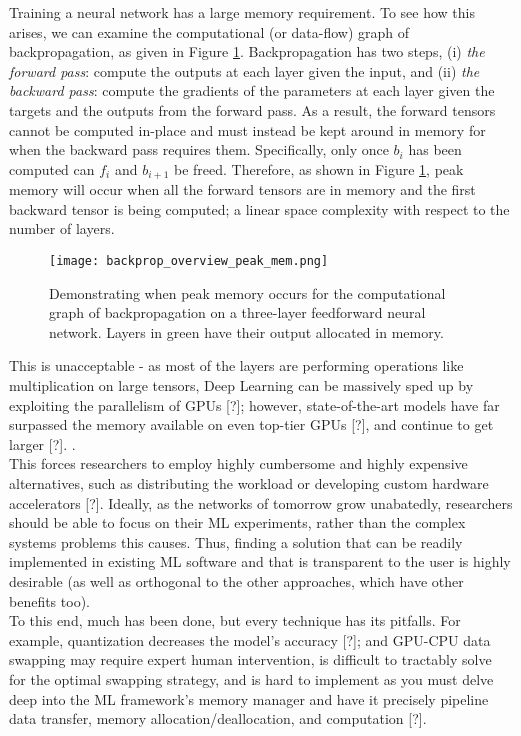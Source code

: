 Training a neural network has a large memory requirement. To see how this arises, we can examine the computational (or data-flow) graph of backpropagation, as given in Figure \ref{fig:1-backprop-peak-mem}. Backpropagation has two steps, (i) \textit{the forward pass}: compute the outputs at each layer given the input, and (ii) \textit{the backward pass}: compute the gradients of the parameters at each layer given the targets and the outputs from the forward pass. As a result, the forward tensors cannot be computed in-place and must instead be kept around in memory for when the backward pass requires them. Specifically, only once \(b_i\) has been computed can \(f_i\) and \(b_{i+1}\) be freed. Therefore, as shown in Figure \ref{fig:1-backprop-peak-mem}, peak memory will occur when all the forward tensors are in memory and the first backward tensor is being computed; a linear space complexity with respect to the number of layers. \\

\begin{figure}[t]
    \centering
    \texttt{[image: backprop\_overview\_peak\_mem.png]}
    \caption{Demonstrating when peak memory occurs for the computational graph of backpropagation on a three-layer feedforward neural network. Layers in green have their output allocated in memory.}
    \label{fig:1-backprop-peak-mem}
\end{figure}

This is unacceptable - as most of the layers are performing operations like multiplication on large tensors, Deep Learning can be massively sped up by exploiting the parallelism of GPUs [?]; however, state-of-the-art models have far surpassed the memory available on even top-tier GPUs [?], and continue to get larger [?]. . \\

This forces researchers to employ highly cumbersome and highly expensive alternatives, such as distributing the workload or developing custom hardware accelerators [?]. Ideally, as the networks of tomorrow grow unabatedly, researchers should be able to focus on their ML experiments, rather than the complex systems problems this causes. Thus, finding a solution that can be readily implemented in existing ML software and that is transparent to the user is highly desirable (as well as orthogonal to the other approaches, which have other benefits too). \\

To this end, much has been done, but every technique has its pitfalls. For example, quantization decreases the model's accuracy [?]; and GPU-CPU data swapping may require expert human intervention, is difficult to tractably solve for the optimal swapping strategy, and is hard to implement as you must delve deep into the ML framework's memory manager and have it precisely pipeline data transfer, memory allocation/deallocation, and computation [?]. \\

